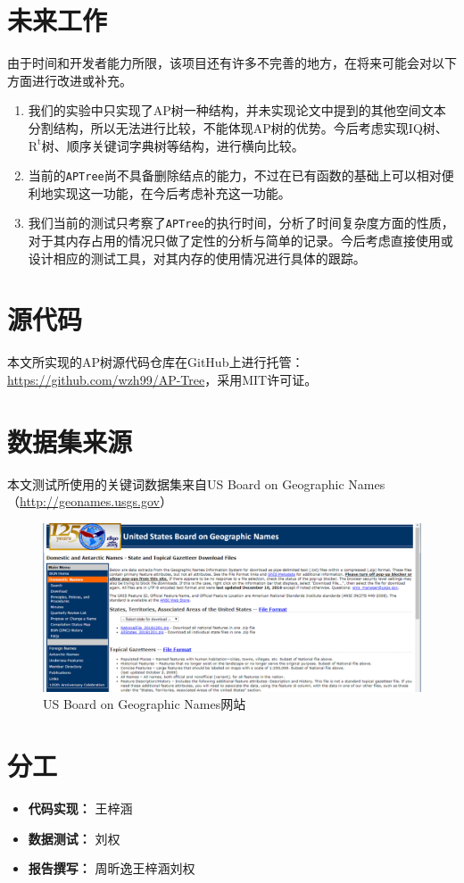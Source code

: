 \documentclass[UTF8]{ctexart}
\begin{document}
\section{未来工作}
由于时间和开发者能力所限，该项目还有许多不完善的地方，在将来可能会对以下方面进行改进或补充。
\begin{enumerate}
    \item 我们的实验中只实现了AP树一种结构，并未实现论文中提到的其他空间文本分割结构，所以无法进行比较，不能体现AP树的优势。今后考虑实现IQ树、$\mathrm{R^t}$树、顺序关键词字典树等结构，进行横向比较。
    \item 当前的\texttt{APTree}尚不具备删除结点的能力，不过在已有函数的基础上可以相对便利地实现这一功能，在今后考虑补充这一功能。
    \item 我们当前的测试只考察了\texttt{APTree}的执行时间，分析了时间复杂度方面的性质，对于其内存占用的情况只做了定性的分析与简单的记录。今后考虑直接使用或设计相应的测试工具，对其内存的使用情况进行具体的跟踪。
\end{enumerate}

\newpage

\begin{appendices}

\section{源代码}
本文所实现的AP树源代码仓库在GitHub上进行托管：\url{https://github.com/wzh99/AP-Tree}，采用MIT许可证。

\section{数据集来源}
本文测试所使用的关键词数据集来自US Board on Geographic Names（\url{http://geonames.usgs.gov}）

\begin{figure}[htbp]
    \centering
    \includegraphics[width=\textwidth]{gn.png}
    \caption{US Board on Geographic Names网站}
\end{figure}

\section{分工}
\begin{itemize}
    \item \textbf{代码实现：} 王梓涵
    \item \textbf{数据测试：} 刘权
    \item \textbf{报告撰写：} 周昕逸\quad 王梓涵\quad 刘权
\end{itemize}

\end{appendices}
\end{document}
